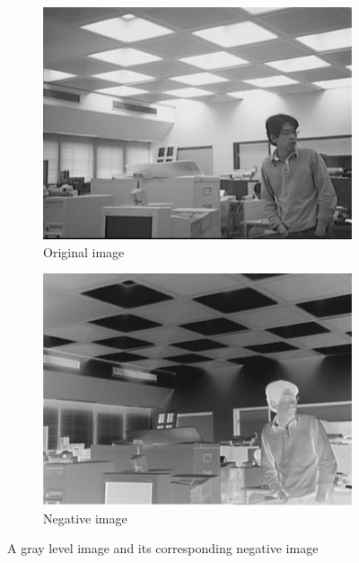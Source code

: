         \begin{figure}[h]
                \centering
                \begin{subfigure}[b]{0.46\textwidth}
                        \centering
                        \includegraphics[width=\textwidth]{chapiter1/figures/original-negative-image.jpg}
                        \caption{Original image}
                \end{subfigure}
                \hfill
                \begin{subfigure}[b]{0.46\textwidth}
                        \centering
                        \includegraphics[width=\textwidth]{chapiter1/figures/negative-image.jpg}
                        \caption{Negative image}
                \end{subfigure}
                \caption{A gray level image and its corresponding negative image}
        \end{figure}

